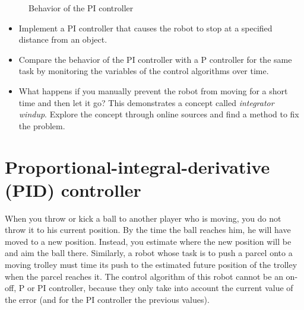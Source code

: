 \begin{figure}
\begin{center}
\caption{Behavior of the PI controller}\label{fig.pi-control}
\end{center}
\end{figure}

\begin{framed}
\begin{itemize}
\item Implement a PI controller that causes the robot to stop at a specified distance from an object.
\item Compare the behavior of the PI controller with a P controller for the same task by monitoring the variables of the control algorithms over time.
\item What happens if you manually prevent the robot from moving for a short time and then let it go? This demonstrates a concept called \emph{integrator windup}. Explore the concept through online sources and find a method to fix the problem.
\end{itemize}
\end{framed}

\section{Proportional-integral-derivative (PID) controller}\label{s.pid}

When you throw or kick a ball to another player who is moving, you do not throw it to his current position. By the time the ball reaches him, he will have moved to a new position. Instead, you estimate where the new position will be and aim the ball there. Similarly, a robot whose task is to push a parcel onto a moving trolley must time its push to the estimated future position of the trolley when the parcel reaches it. The control algorithm of this robot cannot be an on-off, P or PI controller, because they only take into account the current value of the error (and for the PI controller the previous values). 

